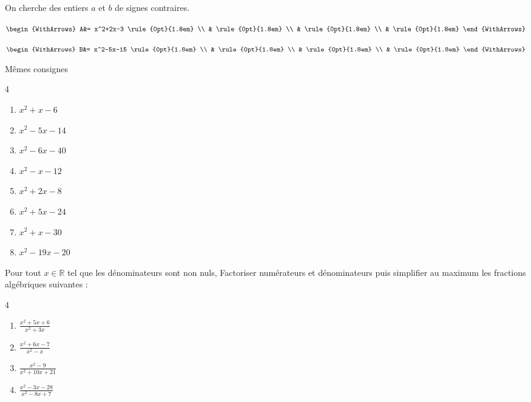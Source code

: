 \begin{example}[Cas p<0] On cherche des entiers $a$ et $b$ de signes contraires.
	
	\noindent\parbox{0.45\linewidth}{	
		$\begin{WithArrows}
			A&= x^2+2x-3 \rule{0pt}{1.8em} \\ 
			& \rule{0pt}{1.8em}  \\  
			&  \rule{0pt}{1.8em}  \\  
			&  \rule{0pt}{1.8em}     
		\end{WithArrows}$
	}   \hfill\parbox{0.48\linewidth}{	
		$\begin{WithArrows}
			B&=  x^2-5x-15  \rule{0pt}{1.8em} \\ 
			& \rule{0pt}{1.8em}  \\  
			&  \rule{0pt}{1.8em}   \\  
			&  \rule{0pt}{1.8em}    
		\end{WithArrows}$
	}  
\end{example}
\begin{exercise}[À vous]\label{chapitre03:exercice:factorisationparessaierreur:niveau02} \label{chapitre03:factorisation:essaierreur02} Mêmes consignes
	\begin{multicols}{4} 
		\begin{enumerate}[label={$\Alph*(x)=$\rule{0pt}{1.8em}}, leftmargin=*] 
			\item $x^2+x-6$
			\item $x^2-5x-14$
			\item $x^2-6x-40$
			\item $x^2-x-12$ 
			\item $x^2+2x-8$
			\item $x^2+5x-24$
			\item $x^2+x-30$
			\item $x^2-19x-20$
		\end{enumerate}
	\end{multicols}
\end{exercise}

\begin{exercise}\label{chapitre03:exercice:factorisationparessaierreur:niveau03}
	Pour tout 	$x\in\mathbb{R}$ tel que les dénominateurs sont non nuls,
	Factoriser numérateurs et dénominateurs puis simplifier au maximum les fractions algébriques suivantes :  \hfill  
	\begin{multicols}{4}
		\begin{enumerate}[label={$\Alph*(x)=$\rule{0pt}{1.8em}},leftmargin=*]
			\item $\frac{x^2+5x+6}{x^2 + 3x}$ 
			\item $\frac{x^2+6x-7}{x^2-x}$
			\item $\frac{x^2-9}{x^2+10x+21}$  
			\item $\frac{x^2-3x-28}{x^2-8x+7}$   
		\end{enumerate}
	\end{multicols} 
\end{exercise}

